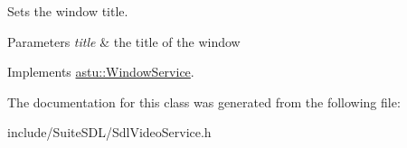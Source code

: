 Sets the window title.


\begin{DoxyParams}{Parameters}
{\em title} & the title of the window \\
\hline
\end{DoxyParams}


Implements \hyperlink{classastu_1_1WindowService_a298dcaad372f611f14edb4ad33044efd}{astu\+::\+Window\+Service}.



The documentation for this class was generated from the following file\+:\begin{DoxyCompactItemize}
\item 
include/\+Suite\+S\+D\+L/Sdl\+Video\+Service.\+h\end{DoxyCompactItemize}

